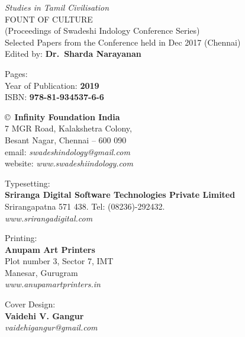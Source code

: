 \thispagestyle{empty}

\noindent
{\fontsize{9}{11}\selectfont\sl Studies in Tamil Civilisation}\\
FOUNT OF CULTURE\\
(Proceedings of Swadeshi Indology Conference Series)\\
Selected Papers from the Conference held in Dec 2017 (Chennai)\\
Edited by: {\bf Dr.\ Sharda Narayanan}
\vfill

\noindent
Pages: {\bf\pageref{bookend}}\\
Year of Publication: {\bf 2019}\\
ISBN: {\bf 978-81-934537-6-6}\\
\vfill

\noindent
\copyright\ {\bf Infinity Foundation India}\\ 
7 MGR Road, Kalakshetra Colony,\\ 
Besant Nagar, Chennai -- 600 090\\
email: {\sl swadeshindology@gmail.com}\\
website: {\sl www.swadeshiindology.com} 
\vfill

\noindent
Typesetting:\\ 
{\bf Sriranga Digital Software Technologies Private Limited}\\ 
Srirangapatna 571 438. Tel: (08236)-292432.\\
{\sl www.srirangadigital.com}
\vfill

\noindent
Printing:\\
{\bf Anupam Art Printers}\\
Plot number 3, Sector 7, IMT\\
Manesar, Gurugram\\
{\sl www.anupamartprinters.in}
\bigskip

\noindent
Cover Design:\\ 
{\bf Vaidehi V. Gangur}\\
{\sl vaidehigangur@gmail.com}

